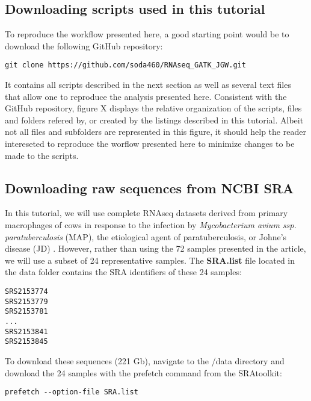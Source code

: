 \subsection{Downloading scripts used in this tutorial}

To reproduce the workflow presented here, a good starting point would be to download the following GitHub repository:

\begin{verbatim}
git clone https://github.com/soda460/RNAseq_GATK_JGW.git
\end{verbatim}

It contains all scripts described in the next section as well as several text files that allow one to reproduce the analysis presented here. Consistent with the GitHub repository, figure X displays the relative organization of the scripts, files and folders refered by, or created by the listings described in this tutorial. Albeit not all files and subfolders are represented in this figure, it should help the reader intereseted to reproduce the worflow presented here to minimize changes to be made to the scripts.





\subsection{Downloading raw sequences from NCBI SRA}

In this tutorial, we will use complete RNAseq datasets derived from primary macrophages of cows  in response to the infection by \textit{Mycobacterium avium ssp. paratuberculosis } (MAP), the etiological agent of paratuberculosis, or Johne’s disease (JD) \cite{Ariel2021}. However, rather than using the 72 samples presented in the article, we will use a subset of 24 representative samples. The \textbf{SRA.list} file located in the data folder contains the SRA identifiers of these 24 samples:

\begin{verbatim}
SRS2153774
SRS2153779
SRS2153781
...
SRS2153841
SRS2153845
\end{verbatim}


To download these sequences (221 Gb), navigate to the /data directory and download the 24 samples with the prefetch command from the SRAtoolkit:

\begin{verbatim}
prefetch --option-file SRA.list
\end{verbatim}

